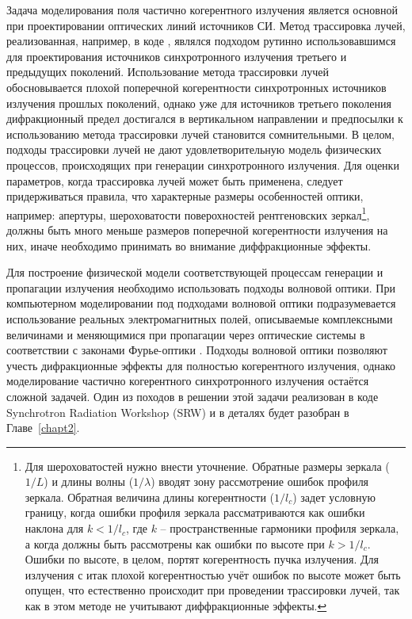 Задача моделирования поля частично когерентного излучения является основной при проектировании оптических линий источников СИ. Метод трассировка лучей, реализованная, например, в коде \cite{sanchez_del_rio_shadow3_2011}, являлся подходом рутинно использовавшимся для проектирования источников синхротронного излучения третьего и предыдущих поколений. Использование метода трассировки лучей обосновывается плохой поперечной когерентности синхротронных источников излучения прошлых поколений, однако уже для источников третьего поколения дифракционный предел достигался в вертикальном направлении и предпосылки к использованию метода трассировки лучей становится сомнительными. В целом, подходы трассировки лучей не дают удовлетворительную модель физических процессов, происходящих при генерации синхротронного излучения. Для оценки параметров, когда трассировка лучей может быть применена, следует придерживаться правила, что характерные размеры особенностей оптики, например: апертуры, шероховатости поверохностей рентгеновских зеркал\footnote{Для шероховатостей нужно внести уточнение. Обратные размеры  зеркала ($1/L$) и длины волны ($1/\lambda$) вводят зону рассмотрение ошибок профиля зеркала. Обратная величина длины когерентности ($1/l_c$) задет условную границу, когда ошибки профиля зеркала рассматриваются как ошибки наклона для $k < 1/l_c$, где $k$ -- пространственные гармоники профиля зеркала, а когда должны быть рассмотрены как ошибки по высоте при $k > 1/l_c$. Ошибки по высоте, в целом, портят когерентность пучка излучения. Для излучения с итак плохой когерентностью учёт ошибок по высоте может быть опущен, что естественно происходит при проведении трассировки лучей, так как в этом методе не учитывают диффракционные эффекты.}, должны быть много меньше размеров поперечной когерентности излучения на них, иначе необходимо принимать во внимание диффракционные эффекты.

Для построение физической модели соответствующей процессам генерации и пропагации излучения необходимо использовать подходы волновой оптики. При компьютерном моделировании под подходами волновой оптики подразумевается использование реальных электромагнитных полей, описываемые комплексными величинами и меняющимися при пропагации через оптические системы в соответствии с законами Фурье-оптики \cite{goodman_introduction_2005}. Подходы волновой оптики позволяют учесть дифракционные эффекты для полностью когерентного излучения, однако моделирование частично когерентного синхротронного излучения остаётся сложной задачей. Один из походов в решении этой задачи реализован в коде Synchrotron Radiation Workshop (SRW) \cite{chubar_accurate_1998} и в деталях будет разобран в Главе~\ref{chapt2}.

